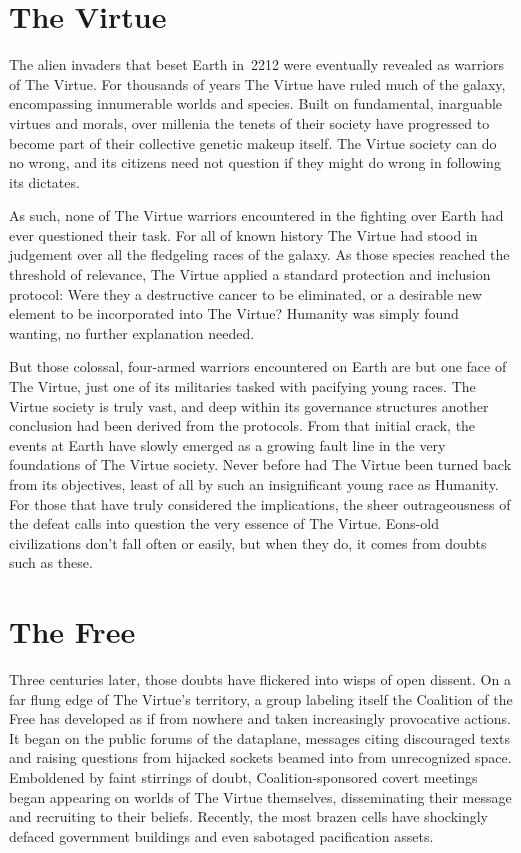 \section{The Virtue}

The alien invaders that beset Earth in~2212 were eventually revealed
as warriors of The Virtue.  For thousands of years The Virtue have
ruled much of the galaxy, encompassing innumerable worlds and species.
Built on fundamental, inarguable virtues and morals, over millenia the
tenets of their society have progressed to become part of their
collective genetic makeup itself.  The Virtue society can do no wrong,
and its citizens need not question if they might do wrong in following
its dictates.

As such, none of The Virtue warriors encountered in the fighting over
Earth had ever questioned their task.  For all of known history The
Virtue had stood in judgement over all the fledgeling races of the
galaxy.  As those species reached the threshold of relevance, The
Virtue applied a standard protection and inclusion protocol: Were they
a destructive cancer to be eliminated, or a desirable new element to
be incorporated into The Virtue?  Humanity was simply found wanting,
no further explanation needed.

But those colossal, four-armed warriors encountered on Earth are but
one face of The Virtue, just one of its militaries tasked with
pacifying young races.  The Virtue society is truly vast, and deep
within its governance structures another conclusion had been derived
from the protocols.  From that initial crack, the events at Earth have
slowly emerged as a growing fault line in the very foundations of The
Virtue society.  Never before had The Virtue been turned back from its
objectives, least of all by such an insignificant young race as
Humanity.  For those that have truly considered the implications, the
sheer outrageousness of the defeat calls into question the very
essence of The Virtue.  Eons-old civilizations don't fall often or
easily, but when they do, it comes from doubts such as these.

\section{The Free}

Three centuries later, those doubts have flickered into wisps of open
dissent.  On a far flung edge of The Virtue's territory, a group
labeling itself the Coalition of the Free has developed as if from
nowhere and taken increasingly provocative actions.  It began on the
public forums of the dataplane, messages citing discouraged texts and
raising questions from hijacked sockets beamed into from unrecognized
space.  Emboldened by faint stirrings of doubt, Coalition-sponsored
covert meetings began appearing on worlds of The Virtue themselves,
disseminating their message and recruiting to their beliefs.
Recently, the most brazen cells have shockingly defaced government
buildings and even sabotaged pacification assets.


